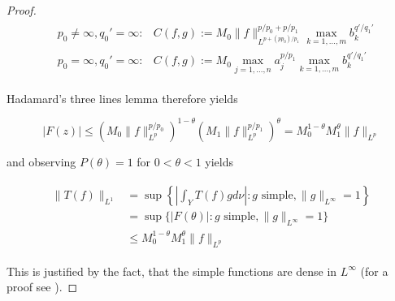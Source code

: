 \begin{proof}
		\begin{gather*}
			\begin{aligned}
				&p_0 \neq \infty, q_0' = \infty: & C(f,g) :=  M_0 \|f\|_{L^{p + (pp_0)/p_1}}^{p/p_0 + p/p_1} \max_{k = 1,\hdots,m} b_k^{q'/q_1'}\\
				&p_0 = \infty, q_0' = \infty: & C(f,g) := M_0 \max_{j = 1,\hdots,n} a_j^{p/p_1} \max_{k = 1,\hdots,m} b_k^{q'/q_1'}
			\end{aligned}
		\end{gather*}

		Hadamard's three lines lemma therefore yields

		\begin{equation}
			\vert F(z)\vert \leqslant \left(M_0 \|f\|_{L^p}^{p/p_0}\right)^{1 - \theta} \left( M_1 \|f\|_{L^p}^{p/p_1}\right)^\theta =  M_0^{1 - \theta} M_1^\theta \|f\|_{L^p}
		\end{equation}

		and observing $P(\theta) = 1$ for $0 < \theta < 1$ yields

		\begin{gather}
			\begin{aligned}
				\| T(f) \|_{L^1} &= \sup \left\{\left\vert \int_Y T(f)gd\nu \right\vert : g \text{ simple}, \|g\|_{L^{\infty}} = 1 \right\}\\
				&= \sup \{\vert F(\theta) \vert : g \text{ simple}, \|g\|_{L^{\infty}} = 1 \}\\
				&\leqslant  M_0^{1 - \theta} M_1^\theta \|f\|_{L^p}
			\end{aligned}
		\end{gather}

		This is justified by the fact, that the simple functions are dense in $L^{\infty}$ (for a proof see \cite[100]{cohn:measure_theory:2013}).	
\end{proof}

